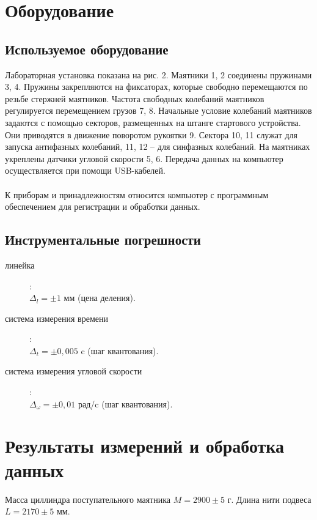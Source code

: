 \documentclass[a4paper]{article}
\begin{document}
\section{Оборудование}

\subsection{Используемое оборудование}
Лабораторная установка показана на рис. 2. Маятники 1, 2 соединены пружинами 3, 4. Пружины закрепляются на фиксаторах, которые свободно перемещаются по резьбе стержней маятников. Частота свободных колебаний маятников регулируется перемещением грузов 7, 8. Начальные условие колебаний маятников задаются с помощью секторов, размещенных на штанге стартового устройства.  Они приводятся в движение поворотом рукоятки 9.  Сектора  10, 11 служат для запуска антифазных колебаний, 11, 12 -- для синфазных колебаний. На маятниках укреплены датчики угловой скорости 5, 6.  Передача данных на компьютер осуществляется при помощи USB-кабелей. \\ \\
К приборам и принадлежностям относится компьютер с программным обеспечением для регистрации и обработки данных.

\subsection{Инструментальные погрешности}
\vspace{0.15 cm}

\begin{description}
    \item[линейка]:
\\ $\Delta_l=\pm 1 $ мм (цена деления).
    \item[система измерения времени]: 
\\ $\Delta_t=\pm0,005$ c (шаг квантования).
    \item[система измерения угловой скорости]: 
\\ $\Delta_\omega=\pm0,01$ рад/c (шаг квантования).
\end{description}
\newpage
\section{Результаты измерений и обработка данных}
Масса циллиндра поступательного маятника $M = 2900 \pm 5$ г. Длина нити подвеса $L = 2170 \pm 5$ мм.
\end{document}
